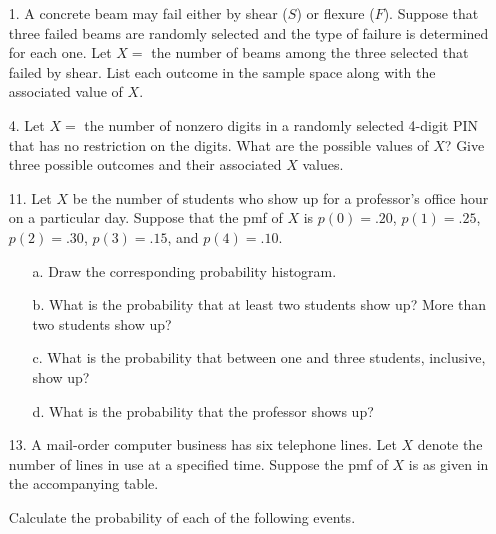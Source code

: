 \documentclass[letterpaper,12pt]{article}
\begin{document}
\maketitle

\begin{enumerate}
  \item[1.]
    A concrete beam may fail either by shear ($S$) or flexure ($F$). Suppose that three failed beams are randomly selected and the type of failure is determined for each one. Let $X =$ the number of beams among the three selected that failed by shear. List each outcome in the sample space along with the associated value of $X$.
  \item[4.]
    Let $X =$ the number of nonzero digits in a randomly selected 4-digit PIN that has no restriction on the digits. What are the possible values of $X$? Give three possible outcomes and their associated $X$ values.
  \item[11.]
    Let $X$ be the number of students who show up for a professor’s office hour on a particular day. Suppose that the pmf of $X$ is $p(0) = .20$, $p(1) = .25$, $p(2) = .30$, $p(3) = .15$, and $p(4) = .10$.
    \begin{enumerate}
      \item[a.]
        Draw the corresponding probability histogram.
      \item[b.]
        What is the probability that at least two students show up? More than two students show up?
      \item[c.]
        What is the probability that between one and three students, inclusive, show up?
      \item[d.]
        What is the probability that the professor shows up?
    \end{enumerate}
  \item[13.]
    A mail-order computer business has six telephone lines. Let $X$ denote the number of lines in use at a specified time. Suppose the pmf of $X$ is as given in the accompanying table.
    \begin{center}
    \end{center}
    Calculate the probability of each of the following events.
    \begin{enumerate}

\end{enumerate}
\end{enumerate}
\end{document}
